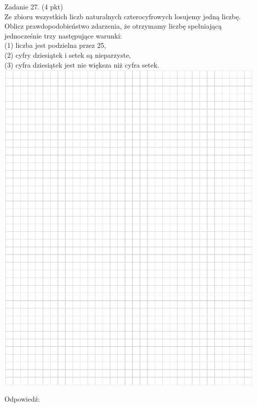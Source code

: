 \documentclass[10pt]{article}
\begin{document}
Zadanie 27. (4 pkt)\\
Ze zbioru wszystkich liczb naturalnych czterocyfrowych losujemy jedną liczbę. Oblicz prawdopodobieństwo zdarzenia, że otrzymamy liczbę spełniającą jednocześnie trzy następujące warunki:\\
(1) liczba jest podzielna przez 25,\\
(2) cyfry dziesiątek i setek są nieparzyste,\\
(3) cyfra dziesiątek jest nie większa niż cyfra setek.\\
\includegraphics[max width=\textwidth, center]{2024_11_21_2c2c97b7feae6d70b078g-11}

Odpowiedź: \(\qquad\)
\end{document}
